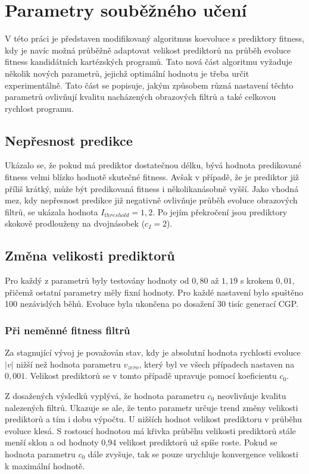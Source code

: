 \section{Parametry souběžného učení}

V této práci je představen modifikovaný algoritmus koevoluce s prediktory fitness, kdy je navíc možná průběžně adaptovat velikost prediktorů na průběh evoluce fitness kandidátních kartézských programů. Tato nová část algoritmu vyžaduje několik nových parametrů, jejichž optimální hodnotu je třeba určit experimentálně. Tato část se popisuje, jakým způsobem různá nastavení těchto parametrů ovlivňují kvalitu nacházených obrazových filtrů a také celkovou rychlost programu.

\subsection{Nepřesnost predikce}

Ukázalo se, že pokud má prediktor dostatečnou délku, bývá hodnota predikované fitness velmi blízko hodnotě skutečné fitness. Avšak v případě, že je prediktor již příliš krátký, může být predikovaná fitness i několikanásobně vyšší. Jako vhodná mez, kdy nepřesnost predikce již negativně ovlivňuje průběh evoluce obrazových filtrů, se ukázala hodnota $I_\mathit{threshold} = 1,2$. Po jejím překročení jsou prediktory skokově prodlouženy na dvojnásobek ($c_I = 2$).

\subsection{Změna velikosti prediktorů}

Pro každý z parametrů byly testovány hodnoty od $0,80$ až $1,19$ s krokem $0,01$, přičemž ostatní parametry měly fixní hodnoty. Pro každé nastavení bylo spuštěno 100 nezávislých běhů. Evoluce byla ukončena po dosažení 30 tisíc generací CGP.

\subsubsection*{Při neměnné fitness filtrů}

Za stagnující vývoj je považován stav, kdy je absolutní hodnota rychlosti evoluce $|v|$ nižší než hodnota parametru $v_\mathit{zero}$, který byl ve všech případech nastaven na $0,001$. Velikost prediktorů se v tomto případě upravuje pomocí koeficientu $c_0$.

Z dosažených výsledků vyplývá, že hodnota parametru $c_0$ neovlivňuje kvalitu nalezených filtrů. Ukazuje se ale, že tento parametr určuje trend změny velikosti prediktorů a tím i dobu výpočtu. U nižších hodnot velikost prediktoru v průběhu evoluce klesá. S rostoucí hodnotou má křivka průběhu velikosti prediktorů stále menší sklon a od hodnoty 0,94 velikost prediktorů už spíše roste. Pokud se hodnota parametru $c_0$ dále zvyšuje, tak se pouze urychluje konvergence velikosti k maximální hodnotě.

